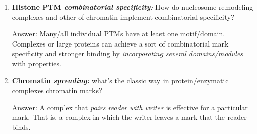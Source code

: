 \documentclass{article}
\newenvironment{QandA}{\begin{enumerate}[label=\bfseries Q\arabic*.]}
                       {\end{enumerate}}
\newenvironment{answered}{\par\normalfont\underline{Answer:}}{}
\begin{document}
\begin{QandA}
\begin{answered}
    \begin{itemize}
      \item{The balance/tradeoff is struck between density and close spatial packing, and dynamism.}
      \item{Pairing a small, dense core with several short but flexible  allows histones to both condense DNA into chromatin while leaving a  or  for functional alteration as cellular needs change.}
    \end{itemize}
    \end{answered}
  \item{\textbf{Histone PTM \textit{combinatorial specificity:}} How do nucleosome remodeling complexes and other  of chromatin implement combinatorial specificity?}
    \begin{answered}
    Many/all individual PTMs have at least one  motif/domain. Complexes or large proteins can achieve a sort of combinatorial mark specificity and stronger binding by \textit{incorporating several domains/modules} with  properties.
    \end{answered}
  \item{\textbf{Chromatin \textit{spreading:}} what's the classic way in protein/enzymatic complexes  chromatin marks?}
    \begin{answered}
    A complex that \textit{pairs reader with writer} is effective for  a particular mark. That is, a complex in which the writer leaves a mark that the reader binds.
    \end{answered}
\end{QandA}
\end{document}
